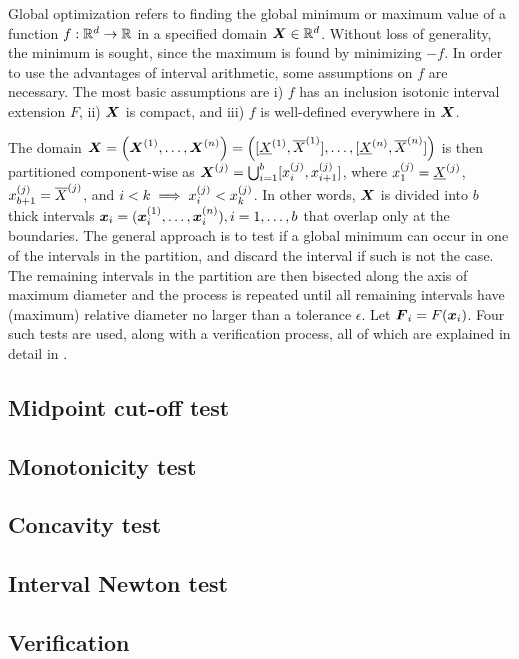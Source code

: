 \documentclass[../scalable-gopt.tex]{subfiles}
\begin{document}
  Global optimization refers to finding the 
  global minimum or maximum value of a function 
  $f: \mathbb{R}^d \to \mathbb{R}$ in a specified domain $\X \in \Rz^d$.
  Without loss of generality, the minimum is sought, 
  since the maximum is found by minimizing $-f$.
  In order to use the advantages of interval arithmetic, 
  some assumptions on $f$ are necessary.
  The most basic assumptions are i) $f$ has an inclusion isotonic interval extension $F$,
  ii) $\X$ is compact, and iii) $f$ is well-defined everywhere in $\X$.

  The domain 
  $\X = \left( \X \ind 1, \dots, \X \ind n \right) = 
  \left( [\ul X \ind 1, \ol X \ind 1], \dots, [\ul X \ind n, \ol X \ind n] \right)$ is
  then partitioned component-wise as 
  $\X \ind j = \bigcup_{i=1}^{b} [x_i \ind j, x_{i+1} \ind j]$, 
  where $x_1 ^{(j)}= \underline X ^{(j)}$, $x_{b+1} ^{(j)} = \overline X ^{(j)}$, 
  and $i < k \implies x_i ^{(j)}< x_k ^{(j)}$.
  In other words, $\X$ is divided into $b$ thick intervals 
  $\x_i = (\x_i \ind 1, \dots, \x_i \ind n), i = 1,\dots,b$ 
  that overlap only at the boundaries.
  The general approach is to test if a global minimum can occur in one of the intervals in the partition, 
  and discard the interval if such is not the case.
  The remaining intervals in the partition are then bisected along the axis of maximum diameter and
  the process is repeated until all remaining intervals have
  (maximum) relative diameter no larger than a tolerance $\epsilon$.
  Let $\F_i = F(\x_i)$.
  Four such tests are used, along with a verification process,
  all of which are explained in detail in \cite{toolbox-hammer}.

  \subsection{Midpoint cut-off test}
    

  \subsection{Monotonicity test}
    

  \subsection{Concavity test}
    

  \subsection{Interval Newton test}
    

  \subsection{Verification}
    
\end{document}
